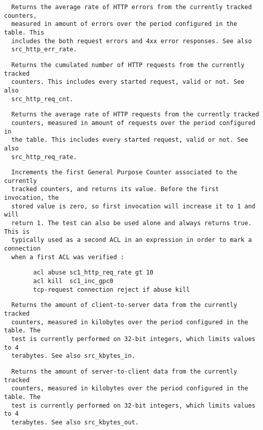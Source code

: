 \begin{verbatim}
  Returns the average rate of HTTP errors from the currently tracked counters,
  measured in amount of errors over the period configured in the table. This
  includes the both request errors and 4xx error responses. See also
  src_http_err_rate.
\end{verbatim}

\begin{verbatim}
  Returns the cumulated number of HTTP requests from the currently tracked
  counters. This includes every started request, valid or not. See also
  src_http_req_cnt.
\end{verbatim}

\begin{verbatim}
  Returns the average rate of HTTP requests from the currently tracked
  counters, measured in amount of requests over the period configured in
  the table. This includes every started request, valid or not. See also
  src_http_req_rate.
\end{verbatim}

\begin{verbatim}
  Increments the first General Purpose Counter associated to the currently
  tracked counters, and returns its value. Before the first invocation, the
  stored value is zero, so first invocation will increase it to 1 and will
  return 1. The test can also be used alone and always returns true. This is
  typically used as a second ACL in an expression in order to mark a connection
  when a first ACL was verified :
\end{verbatim}

\begin{verbatim}
        acl abuse sc1_http_req_rate gt 10
        acl kill  sc1_inc_gpc0
        tcp-request connection reject if abuse kill
\end{verbatim}

\begin{verbatim}
  Returns the amount of client-to-server data from the currently tracked
  counters, measured in kilobytes over the period configured in the table. The
  test is currently performed on 32-bit integers, which limits values to 4
  terabytes. See also src_kbytes_in.
\end{verbatim}

\begin{verbatim}
  Returns the amount of server-to-client data from the currently tracked
  counters, measured in kilobytes over the period configured in the table. The
  test is currently performed on 32-bit integers, which limits values to 4
  terabytes. See also src_kbytes_out.
\end{verbatim}

